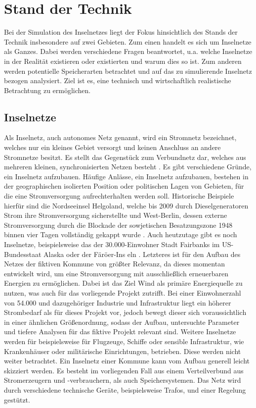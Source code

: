 \chapter{Stand der Technik}

Bei der Simulation des Inselnetzes liegt der Fokus hinsichtlich des Stands der Technik insbesondere auf zwei Gebieten. Zum einen handelt es sich um Inselnetze als Ganzes. Dabei werden verschiedene Fragen beantwortet, u.a. welche Inselnetze in der Realität existieren oder existierten und warum dies so ist. Zum anderen werden potentielle Speicherarten betrachtet und auf das zu simulierende Inselnetz bezogen analysiert. Ziel ist es, eine technisch und wirtschaftlich realistische Betrachtung zu ermöglichen.

\section{Inselnetze}

Als Inselnetz, auch autonomes Netz genannt, wird ein Stromnetz bezeichnet, welches nur ein kleines Gebiet versorgt und keinen Anschluss an andere Stromnetze besitzt. Es stellt das Gegenstück zum Verbundnetz dar, welches aus mehreren kleinen, synchronisierten Netzen besteht . 
Es gibt verschiedene Gründe, ein Inselnetz aufzubauen. Häufige Anlässe, ein Inselnetz aufzubauen, bestehen in der geographischen isolierten Position oder politischen Lagen von Gebieten, für die eine Stromversorgung aufrechterhalten werden soll. Historische Beispiele hierfür sind die Nordseeinsel Helgoland, welche bis 2009 durch Dieselgeneratoren Strom ihre Stromversorgung sicherstellte  und West-Berlin, dessen externe Stromversorgung durch die Blockade der sowjetischen Besatzungszone 1948 binnen vier Tagen vollständig gekappt wurde . Auch heutzutage gibt es noch Inselnetze, beispielsweise das der 30.000-Einwohner Stadt Fairbanks im US-Bundesstaat Alaska  oder der Färöer-Ins eln . Letzteres ist für den Aufbau des Netzes der fiktiven Kommune von größter Relevanz, da dieses momentan entwickelt wird, um eine Stromversorgung mit ausschließlich erneuerbaren Energien zu ermöglichen. Dabei ist das Ziel Wind als primäre Energiequelle zu nutzen, was auch für das vorliegende Projekt zutrifft. Bei einer Einwohnerzahl von 54.000  und dazugehöriger Industrie und Infrastruktur liegt ein höherer Strombedarf als für dieses Projekt vor, jedoch bewegt dieser sich voraussichtlich in einer ähnlichen Größenordnung, sodass der Aufbau, untersuchte Parameter und tiefere Analysen für das fiktive Projekt relevant sind.
Weitere Inselnetze werden für beispielsweise für Flugzeuge, Schiffe oder sensible Infrastruktur, wie Krankenhäuser oder militärische Einrichtungen, betrieben. Diese werden nicht weiter betrachtet.
Ein Inselnetz einer Kommune kann vom Aufbau generell leicht skizziert werden. Es besteht im vorliegenden Fall aus einem Verteilverbund  aus Stromerzeugern und -verbrauchern, als auch Speichersystemen. Das Netz wird durch verschiedene technische Geräte, beispielsweise Trafos, und einer Regelung gestützt. 
 
